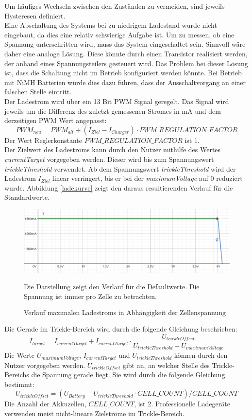 \documentclass[12pt,a4paper,bibliography=totocnumbered,listof=totocnumbered]{article}
\begin{document}
Um häufiges Wechseln zwischen den Zuständen zu vermeiden, sind jeweils Hysteresen definiert.\\
Eine Abschaltung des Systems bei zu niedrigem Ladestand wurde nicht eingebaut, da dies eine relativ schwierige Aufgabe ist.
Um zu messen, ob eine Spannung unterschritten wird, muss das System eingeschaltet sein.
Sinnvoll wäre daher eine analoge Lösung.
Diese könnte durch einen Transistor realisiert werden, der anhand eines Spannungsteilers gesteuert wird.
Das Problem bei dieser Lösung ist, dass die Schaltung nicht im Betrieb konfiguriert werden könnte.
Bei Betrieb mit NiMH Batterien würde dies dazu führen, dass der Ausschaltvorgang an einer falschen Stelle eintritt.\\

Der Ladestrom wird über ein 13 Bit PWM Signal geregelt.
Das Signal wird jeweils um die Differenz des zuletzt gemessenen Stromes in mA und dem derzeitigen PWM Wert angepasst:
$$ PWM_{neu} = PWM_{alt} + (I_{Ziel} - I_{Charger}) \cdot PWM\_REGULATION\_FACTOR $$
Der Wert Reglerkonstante $ PWM\_REGULATION\_FACTOR $ ist 1.\\
Der Zielwert des Ladestroms kann durch den Nutzer mithilfe des Wertes \emph{currentTarget} vorgegeben werden.
Dieser wird bis zum Spannungswert \emph{trickleThreshold} verwendet.
Ab dem Spannungswert \emph{trickleThreshold} wird der Ladestrom $ I_{Ziel} $ linear verringert, bis er bei der \emph{maximumVoltage} auf 0 reduziert wurde.
Abbildung \autoref{ladekurve} zeigt den daraus resultierenden Verlauf für die Standardwerte.
\begin{figure}[htpb] %
    \begin{center}
        \includegraphics[width=13cm,keepaspectratio=true]{pics/ladekurve.png}
        \caption{Verlauf maximalen Ladestroms in Abhängigkeit der Zellenspannung}\label{ladekurve}
    \end{center}
    Die Darstellung zeigt den Verlauf für die Defaultwerte.
    Die Spannung ist immer pro Zelle zu betrachten.
\end{figure}

Die Gerade im Trickle-Bereich wird durch die folgende Gleichung beschrieben:
$$ I_{target} = I_{currentTarget} + I_{currentTarget} \cdot \frac{U_{trickleOffset}} {U_{trickleThreshold} - U_{maximumVoltage}} $$
Die Werte  $ U_{maximumVoltage} $, $ I_{currentTarget} $ und $ U_{trickleThreshold} $ können durch den Nutzer vorgegeben werden.
$ U_{trickleOffset} $ gibt an, an welcher Stelle des Trickle-Bereichs die Spannung gerade liegt.
Sie wird durch die folgende Gleichung bestimmt:
$$ U_{trickleOffset} = (U_{Battery} - U_{trickleThreshold} \cdot CELL\_COUNT) / CELL\_COUNT $$
Die Anzahl der Akkuzellen, $ CELL\_COUNT $, ist 2.
Professionelle Ladegeräte verwenden meist nicht-lineare Zielströme im Trickle-Bereich. \autocite[S. 50f]{chargerBuch}
\end{document}
